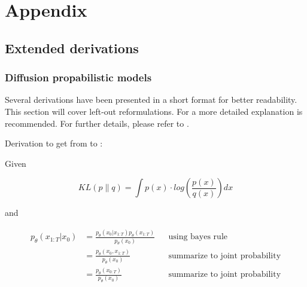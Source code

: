 \renewcommand\thesection{A.\arabic{section}}
\renewcommand\thefigure{A-\arabic{figure}}   
\renewcommand\thetable{A-\arabic{table}}   
\renewcommand\theequation{A.\arabic{equation}}   

\chapter{Appendix} 
\label{ch:Appendix}

\section{Extended derivations}
\label{A:derivations}

\subsection[]{Diffusion propabilistic models}
\label{A:diffusion_prob}
Several derivations have been presented in a short format for better readability.
This section will cover left-out reformulations.
For a more detailed explanation \cite{weng2021WhatAreDiffusion, outlier2022DiffusionModelsPaper} is recommended.
For further details, please refer to \cite{sohl-dickstein2015DeepUnsupervisedLearning, ho2020DenoisingDiffusionProbabilistic}.

\noindent Derivation to get from  to :

\noindent Given

\begin{equation}
    \label{eqn:kl-divergence_appendix}
    KL(p\parallel q) = \int p(x)\cdot log(\frac{p(x)}{q(x)})dx
\end{equation}

\noindent and

\begin{equation}
    \label{eqn:simplify1}
	\begin{align}
    p_\theta(x_{1:T}|x_0) &= \frac{p_\theta(x_0|x_{1:T})p_\theta(x_{1:T})}{p_\theta(x_0)} && \textrm{using bayes rule}\\
	&= \frac{p_\theta(x_0,x_{1:T})}{p_\theta(x_{0})} && \textrm{summarize to joint probability}\\
	&= \frac{p_\theta(x_{0:T})}{p_\theta(x_{0})} && \textrm{summarize to joint probability}\\
	\end{align}
\end{equation}

